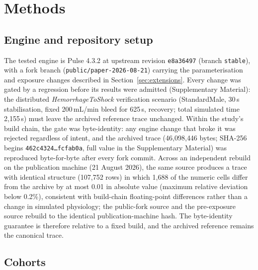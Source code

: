 \documentclass[preprint,12pt,nopreprintline]{elsarticle}
\begin{document}
\section{Methods}

\subsection{Engine and repository setup}

The tested engine is Pulse 4.3.2 at upstream revision \texttt{e8a36497} (branch \texttt{stable}), with a fork branch (\texttt{public/paper-2026-08-21}) carrying the parameterisation and exposure changes described in Section~\ref{sec:extensions}. Every change was gated by a regression before its results were admitted (Supplementary Material): the distributed \emph{HemorrhageToShock} verification scenario (StandardMale, 30\,s stabilisation, fixed 200\,mL/min bleed for 625\,s, recovery; total simulated time 2{,}155\,s) must leave the archived reference trace unchanged. Within the study's build chain, the gate was byte-identity: any engine change that broke it was rejected regardless of intent, and the archived trace (46{,}098{,}446 bytes; SHA-256 begins \texttt{462c4324\ldots{}fcfab0a}, full value in the Supplementary Material) was reproduced byte-for-byte after every fork commit. Across an independent rebuild on the publication machine (21 August 2026), the same source produces a trace with identical structure (107{,}752 rows) in which 1{,}688 of the numeric cells differ from the archive by at most 0.01 in absolute value (maximum relative deviation below 0.2\%), consistent with build-chain floating-point differences rather than a change in simulated physiology; the public-fork source and the pre-exposure source rebuild to the identical publication-machine hash. The byte-identity guarantee is therefore relative to a fixed build, and the archived reference remains the canonical trace.

\subsection{Cohorts}
\end{document}
